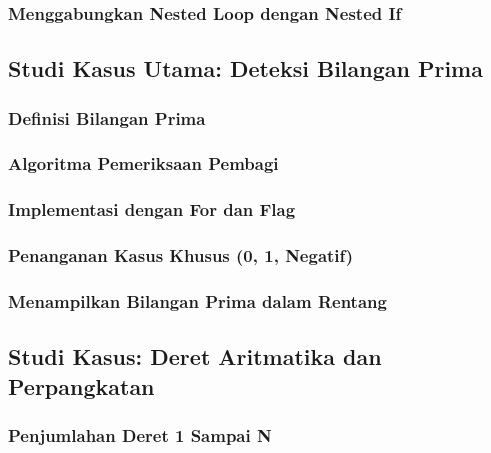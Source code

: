 \documentclass[12pt,a4paper]{article}
\begin{document}
\subsubsection{Menggabungkan Nested Loop dengan Nested If}

\subsection{Studi Kasus Utama: Deteksi Bilangan Prima}

\subsubsection{Definisi Bilangan Prima}

\subsubsection{Algoritma Pemeriksaan Pembagi}

\subsubsection{Implementasi dengan For dan Flag}

\subsubsection{Penanganan Kasus Khusus (0, 1, Negatif)}

\subsubsection{Menampilkan Bilangan Prima dalam Rentang}

\subsection{Studi Kasus: Deret Aritmatika dan Perpangkatan}

\subsubsection{Penjumlahan Deret 1 Sampai N}
\end{document}
